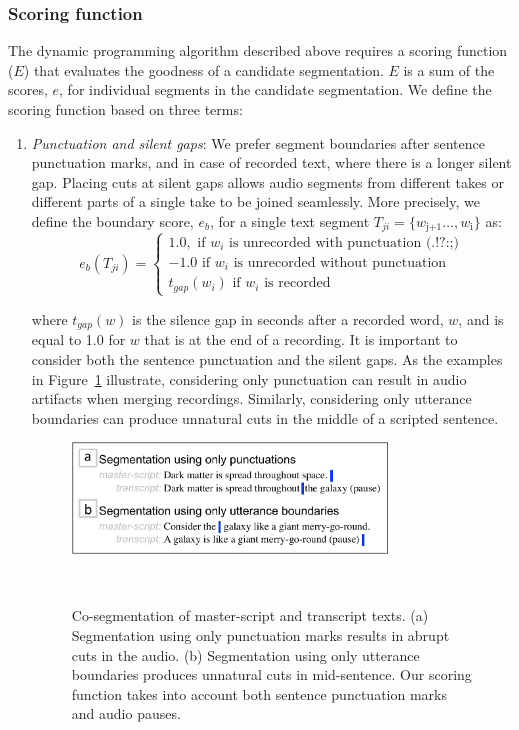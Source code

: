 \subsubsection{Scoring function}
The dynamic programming algorithm described above requires a
scoring function ($E$) that evaluates the goodness of a candidate segmentation. $E$ is a sum of the scores, $e$, for individual segments in the candidate segmentation. We define the scoring function
based on three terms: 
\begin{enumerate}
\item{\textit{Punctuation and silent gaps}: We prefer segment boundaries after sentence punctuation marks, and in case of recorded text, where there is a longer silent gap. Placing cuts at silent gaps allows audio segments from different takes or different parts of a single take to be joined seamlessly. More precisely, we define the boundary score, $e_b$, for a single text segment $T_{ji} = \{w_\text{j+1}
\dots,w_\text{i}\}$ as:
\begin{equation}
    e_b(T_{ji})= 
\begin{cases}
   1.0, \text{ if } w_i \text{ is unrecorded with punctuation (.!?:;)}\\
   -1.0 \text{ if } w_i \text{ is unrecorded without punctuation}\\
   t_{gap}(w_{i}) \text{ if } w_i \text{ is recorded} 
\end{cases}
\end{equation}

where $t_{gap}(w)$ is the silence gap in seconds after a recorded word, $w$, and is equal to 1.0 for $w$ that is at the end of a recording.
It is important to consider both the sentence punctuation and the silent gaps. As the examples in Figure~\ref{fig:scoringfunc} illustrate, considering only punctuation can result in audio artifacts when merging recordings. Similarly, considering only utterance boundaries can produce unnatural cuts in the middle of a scripted sentence.
}
%

\begin{figure}[!h]
\centering
  \includegraphics[width=0.8\textwidth]{figures/scoringfunc.pdf}
  \caption{Co-segmentation of master-script and transcript texts. (a) Segmentation using only punctuation marks results in abrupt cuts in the audio. (b) Segmentation using only utterance boundaries produces unnatural cuts in mid-sentence. Our scoring function takes into account both sentence punctuation marks and audio pauses.}~\label{fig:scoringfunc}
\end{figure}
%


\end{enumerate}
